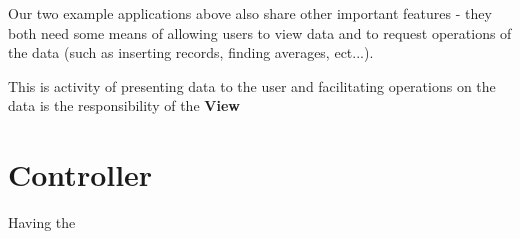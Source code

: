 Our two example applications above also share other important features - they both need some means of allowing users to view data and to request operations of the data (such as inserting records, finding averages, ect...). 

This is activity of presenting data to the user and facilitating operations on the data is the responsibility of the \textbf{View}

\section{Controller}

Having the 